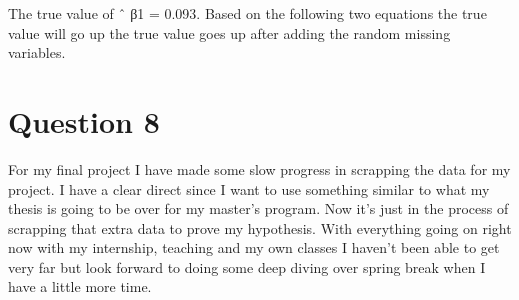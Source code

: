 \documentclass{article}
\begin{document}
The true value of ˆ β1 = 0.093. 
Based on the following two equations the true value will go up the true value goes up after adding the random missing variables. 

\section{Question 8}

For my final project I have made some slow progress in scrapping the data for my project. I have a clear direct since I want to use something similar to what my thesis is going to be over for my master's program. Now it's just in the process of scrapping that extra data to prove my hypothesis. With everything going on right now with my internship, teaching and my own classes I haven't been able to get very far but look forward to doing some deep diving over spring break when I have a little more time. 
\end{document}
